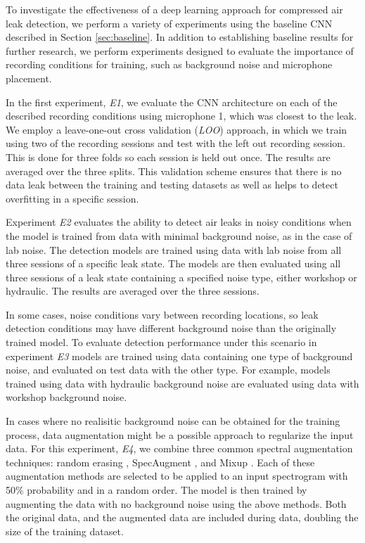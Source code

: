 To investigate the effectiveness of a deep learning approach for compressed air leak detection, we perform a variety of experiments using the baseline CNN described in Section \ref{sec:baseline}. In addition to establishing baseline results for further research, we perform experiments designed to evaluate the importance of recording conditions for training, such as background noise and microphone placement.

In the first experiment, \textit{E1}, we evaluate the CNN architecture on each of the described recording conditions using microphone 1, which was closest to the leak. We employ a leave-one-out cross validation (\textit{LOO}) approach, in which we train using two of the recording sessions and test with the left out recording session. This is done for three folds so each session is held out once. The results are averaged over the three splits. This validation scheme ensures that there is no data leak between the training and testing datasets as well as helps to detect overfitting in a specific session.

Experiment \textit{E2} evaluates the ability to detect air leaks in noisy conditions when the model is trained from data with minimal background noise, as in the case of lab noise. The detection models are trained using data with lab noise from all three sessions of a specific leak state. The models are then evaluated using all three sessions of a leak state containing a specified noise type, either workshop or hydraulic. The results are averaged over the three sessions.

In some cases, noise conditions vary between recording locations, so leak detection conditions may have different background noise than the originally trained model. To evaluate detection performance under this scenario in experiment \textit{E3} models are trained using data containing one type of background noise, and evaluated on test data with the other type. For example, models trained using data with hydraulic background noise are evaluated using data with workshop background noise. 

In cases where no realisitic background noise can be obtained for the training process, data augmentation \cite{zhong2017randomerase, Zhang2018:mixup, Park2019:spec_aug} might be a possible approach to regularize the input data. For this experiment, \textit{E4}, we combine three common spectral augmentation techniques: random erasing \cite{zhong2017randomerase}, SpecAugment \cite{Park2019:spec_aug}, and Mixup \cite{Zhang2018:mixup}. Each of these augmentation methods are selected to be applied to an input spectrogram with 50\% probability and in a random order. The model is then trained by augmenting the data with no background noise using the above methods. Both the original data, and the augmented data are included during data, doubling the size of the training dataset.

